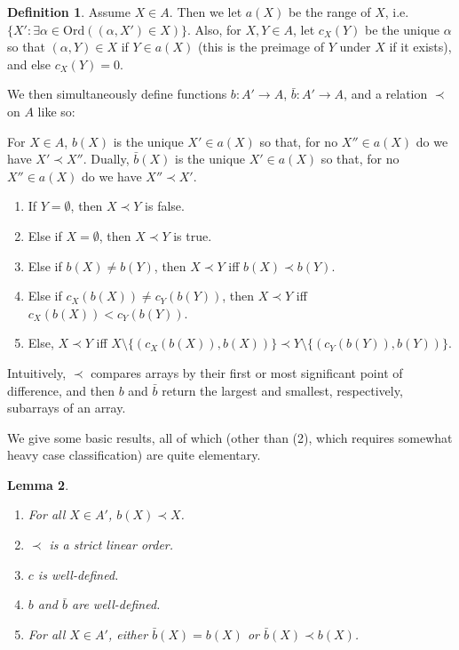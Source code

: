 \documentclass{article}
\theoremstyle{definition}
\newtheorem{definition}{Definition}[section]
\theoremstyle{plain}
\theoremstyle{plain}
\theoremstyle{plain}
\theoremstyle{plain}
\theoremstyle{remark}
\theoremstyle{remark}
\theoremstyle{remark}
\theoremstyle{plain}
\newtheorem{lemma}[definition]{Lemma}
\theoremstyle{plain}
\begin{document}
\begin{definition}
Assume $X \in A$. Then we let $a(X)$ be the range of $X$, i.e. $\{X': \exists \alpha \in \mathrm{Ord} ((\alpha, X') \in X)\}$. Also, for $X, Y \in A$, let $c_X(Y)$ be the unique $\alpha$ so that $(\alpha, Y) \in X$ if $Y \in a(X)$ (this is the preimage of $Y$ under $X$ if it exists), and else $c_X(Y) = 0$.

We then simultaneously define functions $b: A' \to A$, $\bar{b}: A' \to A$, and a relation $\prec$ on $A$ like so:

For $X \in A$, $b(X)$ is the unique $X' \in a(X)$ so that, for no $X'' \in a(X)$ do we have $X' \prec X''$. Dually, $\bar{b}(X)$ is the unique $X' \in a(X)$ so that, for no $X'' \in a(X)$ do we have $X'' \prec X'$.

\begin{enumerate}
    \item If $Y = \emptyset$, then $X \prec Y$ is false.
    \item Else if $X = \emptyset$, then $X \prec Y$ is true.
    \item Else if $b(X) \neq b(Y)$, then $X \prec Y$ iff $b(X) \prec b(Y)$.
    \item Else if $c_X(b(X)) \neq c_Y(b(Y))$, then $X \prec Y$ iff $c_X(b(X)) < c_Y(b(Y))$.
    \item Else, $X \prec Y$ iff $X \setminus \{(c_X(b(X)), b(X))\} \prec Y \setminus \{(c_Y(b(Y)), b(Y))\}$.
\end{enumerate}
\end{definition}

Intuitively, $\prec$ compares arrays by their first or most significant point of difference, and then $b$ and $\bar{b}$ return the largest and smallest, respectively, subarrays of an array.

We give some basic results, all of which (other than (2), which requires somewhat heavy case classification) are quite elementary.

\begin{lemma}\;
\begin{enumerate}
    \item For all $X \in A'$, $b(X) \prec X$.
    \item $\prec$ is a strict linear order.
    \item $c$ is well-defined.
    \item $b$ and $\bar{b}$ are well-defined.
    \item For all $X \in A'$, either $\bar{b}(X) = b(X)$ or $\bar{b}(X) \prec b(X)$.
\end{enumerate}
\end{lemma}
\end{document}
